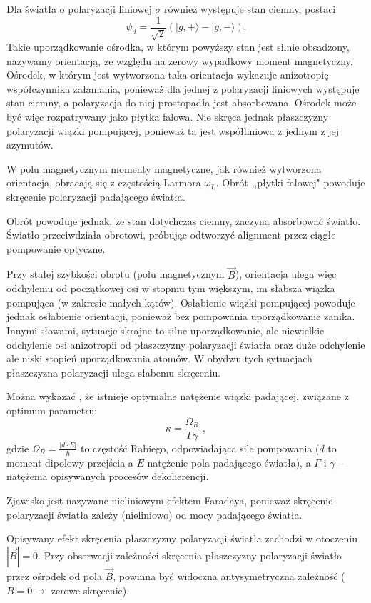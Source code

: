 \documentclass[a4paper,10pt]{article}
\begin{document}
Dla światła o polaryzacji liniowej $\sigma$ również występuje stan ciemny, postaci $$\psi_d=\frac{1}{\sqrt{2}} (|g,+\rangle-|g,-\rangle).$$ Takie uporządkowanie ośrodka, w którym powyższy stan jest silnie obsadzony, nazywamy orientacją, ze względu na zerowy wypadkowy moment magnetyczny. Ośrodek, w którym jest wytworzona taka orientacja wykazuje anizotropię współczynnika załamania, ponieważ dla jednej z polaryzacji liniowych występuje stan ciemny, a polaryzacja do niej prostopadła jest absorbowana. Ośrodek może być więc rozpatrywany jako płytka falowa. Nie skręca jednak płaszczyzny polaryzacji wiązki pompującej, ponieważ ta jest współliniowa z jednym z jej azymutów.

W polu magnetycznym momenty magnetyczne, jak również wytworzona orientacja, obracają się z częstością Larmora $\omega_L$. Obrót ,,płytki falowej" powoduje skręcenie polaryzacji padającego światła.

Obrót powoduje jednak, że stan dotychczas ciemny, zaczyna absorbować światło. Światło przeciwdziała obrotowi, próbując odtworzyć alignment przez ciągłe pompowanie optyczne.

Przy stałej szybkości obrotu (polu magnetycznym $\vec B$), orientacja ulega więc odchyleniu od początkowej osi w stopniu tym większym, im słabsza wiązka pompująca (w zakresie małych kątów). Osłabienie wiązki pompującej powoduje jednak osłabienie orientacji, ponieważ bez pompowania uporządkowanie zanika. Innymi słowami, sytuacje skrajne to silne uporządkowanie, ale niewielkie odchylenie osi anizotropii od płaszczyzny polaryzacji światła oraz duże odchylenie ale niski stopień uporządkowania atomów. W obydwu tych sytuacjach płaszczyzna polaryzacji ulega słabemu skręceniu.

Można wykazać \cite{srivansan}, że istnieje optymalne natężenie wiązki padającej, związane z optimum parametru:
\begin{equation}
\kappa=\frac{\Omega_R}{\Gamma\gamma} \; ,
\end{equation}
gdzie $\Omega_R=\frac{|d \cdot E|}{\hbar}$ to częstość Rabiego, odpowiadająca sile pompowania ($d$ to moment dipolowy przejścia a $E$ natężenie pola padającego światła), a $\Gamma$ i $\gamma$ -- natężenia opisywanych procesów dekoherencji.

Zjawisko jest nazywane nieliniowym efektem Faradaya, ponieważ skręcenie polaryzacji światła zależy (nieliniowo) od mocy padającego światła.

Opisywany efekt skręcenia płaszczyzny polaryzacji światła zachodzi w otoczeniu $|\vec B|=0$. Przy obserwacji zależności skręcenia płaszczyzny polaryzacji światła przez ośrodek od pola $\vec B$, powinna być widoczna antysymetryczna zależność ($B=0\rightarrow$ zerowe skręcenie).
\end{document}
